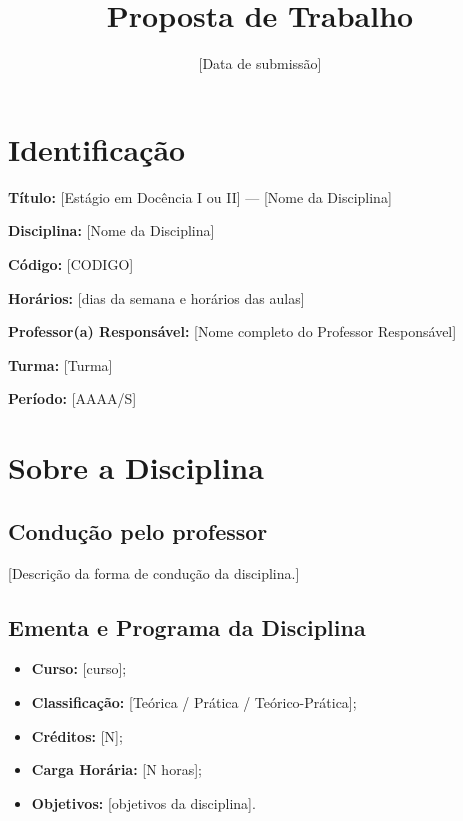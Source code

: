 \documentclass[12pt, a4paper]{article}
\title{\textbf{\EstagioNivel{} \\ Proposta de Trabalho}}
\author{\NomeEstagiario}
\date{[Data de submissão]}
\newcommand{\EstagioNivel}{[Estágio em Docência I ou II]}
\newcommand{\NomeDisciplina}{[Nome da Disciplina]}
\newcommand{\CodigoDisciplina}{[CODIGO]}
\newcommand{\Turma}{[Turma]}
\newcommand{\Horarios}{[dias da semana e horários das aulas]}
\newcommand{\Semestre}{[AAAA/S]}
\newcommand{\NomeProfessor}{[Nome completo do Professor Responsável]}
\newif\ifmostrarinstrucoes
\newcommand{\instrucao}[1]{%
  \ifmostrarinstrucoes
  \begin{tcolorbox}[colback=instrbg, colframe=dccblue, arc=2mm, boxrule=0.6pt,
    title=\textbf{INSTRUÇÃO (apagar na versão final)}, fonttitle=\small]
  \small #1
  \end{tcolorbox}
  \fi}
\begin{document}
\maketitle

\section{Identificação} \label{sec:identificacao}
\instrucao{Item 1 das Diretrizes. A proposta deve ser previamente acertada com o professor responsável pela turma à qual você foi alocado. Confira os dados na planilha oficial de alocação do semestre.}

\textbf{Título:} \EstagioNivel{} --- \NomeDisciplina

\textbf{Disciplina:} \NomeDisciplina

\textbf{Código:} \CodigoDisciplina

\textbf{Horários:} \Horarios

\textbf{Professor(a) Responsável:} \NomeProfessor

\textbf{Turma:} \Turma

\textbf{Período:} \Semestre

\section{Sobre a Disciplina} \label{sec:disciplina}
\instrucao{Item 2 das Diretrizes: descreva a disciplina conforme o plano de ensino oficial e a condução adotada pelo professor. Consulte o plano de ensino e o professor para garantir fidelidade.}

\subsection{Condução pelo professor}
\instrucao{1 ou 2 parágrafos: modalidade (teórica, prática, teórico-prática), número de aulas semanais, uso do Moodle, laboratórios, trabalhos práticos etc.}
[Descrição da forma de condução da disciplina.]

\subsection{Ementa e Programa da Disciplina}
\instrucao{Copie a ementa oficial e o programa detalhado (lista numerada de tópicos). Informe também curso, classificação, créditos, carga horária e objetivos.}
\begin{itemize}
    \item \textbf{Curso:} [curso];
    \item \textbf{Classificação:} [Teórica / Prática / Teórico-Prática];
    \item \textbf{Créditos:} [N];
    \item \textbf{Carga Horária:} [N horas];
    \item \textbf{Objetivos:} [objetivos da disciplina].
\end{itemize}
\end{document}
